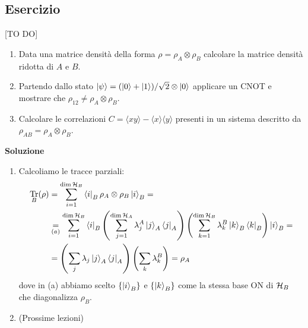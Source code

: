 \documentclass[../../InformazioneQuantistica.tex]{subfiles}
\begin{document}
\subsection{Esercizio} [TO DO]
\begin{enumerate}
\item Data una matrice densità della forma $\rho = \rho_A \otimes \rho_B$  calcolare la matrice densità ridotta di $A$ e $B$.
\item Partendo dallo stato $\Ket{\psi}= (\Ket{0}+\Ket{1})/\sqrt{2} \otimes \Ket{0}$ applicare un CNOT e mostrare che $\rho_{12}\neq \rho_A \otimes \rho_B$.
\item Calcolare le correlazioni $C=\langle x y\rangle - \langle x \rangle \langle y\rangle$ presenti in un sistema descritto da $\rho_{AB}=\rho_A \otimes \rho_B$.
\end{enumerate}

\textbf{Soluzione}
\begin{enumerate}
\item Calcoliamo le tracce parziali:
\begin{align*}
\underset{B}{\operatorname{Tr}} (\rho) &= \sum_{i=1}^{\operatorname{dim}\mathcal{H}_B} \Bra{i}_B \rho_A \otimes \rho_B \Ket{i}_B =\\
&\underset{(a)}{=} \sum_{i=1}^{\operatorname{dim}\mathcal{H}_B}
\Bra{i}_B \left(\sum_{j=1}^{\operatorname{dim}\mathcal{H}_A} \lambda_j^A \Ket{j}_A\Bra{j}_A\right)\left( \sum_{k=1}^{\operatorname{dim}\mathcal{H}_B}\lambda_k^B \Ket{k}_B\Bra{k}_B\right)\Ket{i}_B =\\
&= \left(\sum_j \lambda_j \Ket{j}_A\Bra{j}_A\right) \left(\sum_k \lambda_k^B \right) = \rho_A
\end{align*}
dove in (a) abbiamo scelto $\{\Ket{i}_B\}$ e $\{\Ket{k}_B\}$ come la stessa base ON di $\mathcal{H}_B$ che diagonalizza $\rho_B$. \item (Prossime lezioni)
\end{enumerate}
\end{document}
